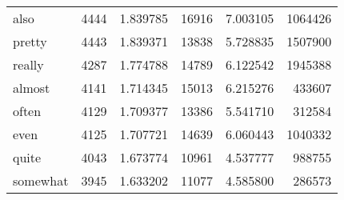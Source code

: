 \begin{table}[ht]
\begin{tabular}{lrrrrr}
also & {\cellcolor[HTML]{DAE7F1}} \color[HTML]{000000} 4444 & {\cellcolor[HTML]{DAE7F1}} \color[HTML]{000000} 1.839785 & {\cellcolor[HTML]{DBE8F2}} \color[HTML]{000000} 16916 & {\cellcolor[HTML]{DBE8F2}} \color[HTML]{000000} 7.003105 & {\cellcolor[HTML]{E6F0F6}} \color[HTML]{000000} 1064426 \\
pretty & {\cellcolor[HTML]{DAE7F1}} \color[HTML]{000000} 4443 & {\cellcolor[HTML]{DAE7F1}} \color[HTML]{000000} 1.839371 & {\cellcolor[HTML]{E7F1F7}} \color[HTML]{000000} 13838 & {\cellcolor[HTML]{E7F1F7}} \color[HTML]{000000} 5.728835 & {\cellcolor[HTML]{DBE8F2}} \color[HTML]{000000} 1507900 \\
really & {\cellcolor[HTML]{DEEAF3}} \color[HTML]{000000} 4287 & {\cellcolor[HTML]{DEEAF3}} \color[HTML]{000000} 1.774788 & {\cellcolor[HTML]{E4EEF5}} \color[HTML]{000000} 14789 & {\cellcolor[HTML]{E4EEF5}} \color[HTML]{000000} 6.122542 & {\cellcolor[HTML]{CEDFEC}} \color[HTML]{000000} 1945388 \\
almost & {\cellcolor[HTML]{E1ECF4}} \color[HTML]{000000} 4141 & {\cellcolor[HTML]{E1ECF4}} \color[HTML]{000000} 1.714345 & {\cellcolor[HTML]{E3EEF5}} \color[HTML]{000000} 15013 & {\cellcolor[HTML]{E3EEF5}} \color[HTML]{000000} 6.215276 & {\cellcolor[HTML]{F3F9FB}} \color[HTML]{000000} 433607 \\
often & {\cellcolor[HTML]{E1EDF5}} \color[HTML]{000000} 4129 & {\cellcolor[HTML]{E1EDF5}} \color[HTML]{000000} 1.709377 & {\cellcolor[HTML]{E9F2F7}} \color[HTML]{000000} 13386 & {\cellcolor[HTML]{E9F2F7}} \color[HTML]{000000} 5.541710 & {\cellcolor[HTML]{F5FAFC}} \color[HTML]{000000} 312584 \\
even & {\cellcolor[HTML]{E1EDF5}} \color[HTML]{000000} 4125 & {\cellcolor[HTML]{E1EDF5}} \color[HTML]{000000} 1.707721 & {\cellcolor[HTML]{E4EFF6}} \color[HTML]{000000} 14639 & {\cellcolor[HTML]{E4EFF6}} \color[HTML]{000000} 6.060443 & {\cellcolor[HTML]{E6F0F7}} \color[HTML]{000000} 1040332 \\
quite & {\cellcolor[HTML]{E3EEF5}} \color[HTML]{000000} 4043 & {\cellcolor[HTML]{E3EEF5}} \color[HTML]{000000} 1.673774 & {\cellcolor[HTML]{F1F8FB}} \color[HTML]{000000} 10961 & {\cellcolor[HTML]{F1F8FB}} \color[HTML]{000000} 4.537777 & {\cellcolor[HTML]{E7F1F7}} \color[HTML]{000000} 988755 \\
somewhat & {\cellcolor[HTML]{E5EFF6}} \color[HTML]{000000} 3945 & {\cellcolor[HTML]{E5EFF6}} \color[HTML]{000000} 1.633202 & {\cellcolor[HTML]{F1F8FB}} \color[HTML]{000000} 11077 & {\cellcolor[HTML]{F1F8FB}} \color[HTML]{000000} 4.585800 & {\cellcolor[HTML]{F6FBFC}} \color[HTML]{000000} 286573 \\

\end{tabular}
\end{table}
